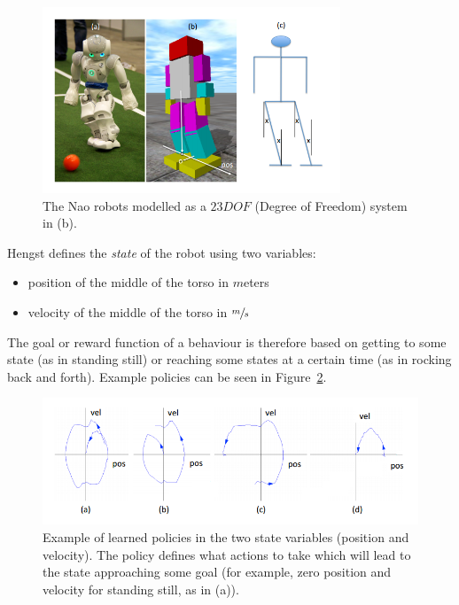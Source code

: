 \begin{figure}[h]
\centering
\includegraphics[width=3.5in]{img/RL_lean.png}
\vspace{-10pt}
\caption{The Nao robots modelled as a $23 DOF$ (Degree of Freedom) system in (b). \cite{bernhard_rl}}
\label{fig:lean}
\end{figure}

Hengst defines the \textit{state} of the robot using two variables:
\begin{itemize}
\item position of the middle of the torso in $m$eters
\item velocity of the middle of the torso in $\sfrac{m}{s}$
\end{itemize}

The goal or reward function of a behaviour is therefore based on getting to some state (as in standing still) or reaching some states at a certain time (as in rocking back and forth). Example policies can be seen in Figure~\ref{fig:policy_diagram}.

\begin{figure}[!h]
\centering
\includegraphics[width=5in]{img/RL_policies.png}
\vspace{-10pt}
\caption{Example of learned policies in the two state variables (position and velocity). The policy defines what actions to take which will lead to the state approaching some goal (for example, zero position and velocity for standing still, as in (a)).\cite{bernhard_rl}}
\label{fig:policy_diagram}
\end{figure}


